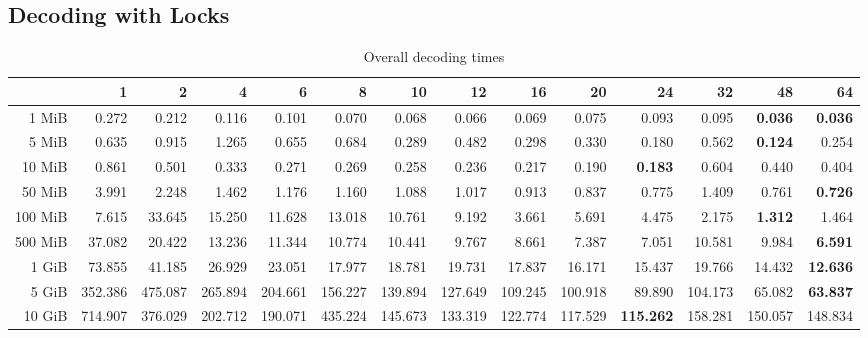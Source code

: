 \subsection{Decoding with Locks}
\begin{table}[!h]
	\centering
	\caption{Overall decoding times}
	\begin{tabular}{rrrrrrrrrrrrrr}
		\toprule
		\diagbox[width=7em]{Sizes}{Threads}  & 1  &      2  &      4  &      6  &      8  &      10 &      12 &      16 &      20 &      24 &      32 &      48 &      64 \\
		\midrule
		1 MiB   &   0.272 &   0.212 &   0.116 &   0.101 &   0.070 &   0.068 &   0.066 &   0.069 &   0.075 &   0.093 &   0.095 &   \textbf{0.036} &   \textbf{0.036} \\
		5 MiB   &   0.635 &   0.915 &   1.265 &   0.655 &   0.684 &   0.289 &   0.482 &   0.298 &   0.330 &   0.180 &   0.562 &   \textbf{0.124} &   0.254 \\
		10 MiB  &   0.861 &   0.501 &   0.333 &   0.271 &   0.269 &   0.258 &   0.236 &   0.217 &   0.190 &   \textbf{0.183} &   0.604 &   0.440 &   0.404 \\
		50 MiB  &   3.991 &   2.248 &   1.462 &   1.176 &   1.160 &   1.088 &   1.017 &   0.913 &   0.837 &   0.775 &   1.409 &   0.761 &   \textbf{0.726} \\
		100 MiB &   7.615 &  33.645 &  15.250 &  11.628 &  13.018 &  10.761 &   9.192 &   3.661 &   5.691 &   4.475 &   2.175 &   \textbf{1.312} &   1.464 \\
		500 MiB &  37.082 &  20.422 &  13.236 &  11.344 &  10.774 &  10.441 &   9.767 &   8.661 &   7.387 &   7.051 &  10.581 &   9.984 &   \textbf{6.591} \\
		1 GiB   &  73.855 &  41.185 &  26.929 &  23.051 &  17.977 &  18.781 &  19.731 &  17.837 &  16.171 &  15.437 &  19.766 &  14.432 &  \textbf{12.636} \\
		5 GiB   & 352.386 & 475.087 & 265.894 & 204.661 & 156.227 & 139.894 & 127.649 & 109.245 & 100.918 &  89.890 & 104.173 &  65.082 &  \textbf{63.837} \\
		10 GiB  & 714.907 & 376.029 & 202.712 & 190.071 & 435.224 & 145.673 & 133.319 & 122.774 & 117.529 & \textbf{115.262} & 158.281 & 150.057 & 148.834 \\
		\bottomrule
	\end{tabular}
\end{table}

